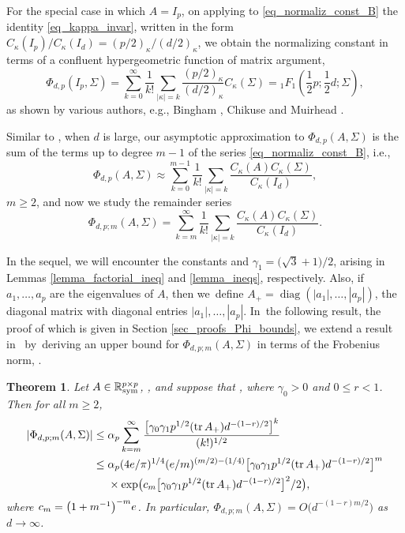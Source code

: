 \documentclass[11pt]{article}
\numberwithin{equation}{section}
\numberwithin{equation}{section}
\newtheorem{Theorem}{Theorem}[section]
\def\R {\mathbb{R}}
\def\tr {\mathop{\mathrm{tr}}}
\def\diag{\mathop{\mathrm{diag}}}
\newcommand{\sym}{{{\hskip-1pt}\mathop{\mathrm{sym}}}}
\begin{document}
For the special case in which $A = I_p$, on applying to \eqref{eq_normaliz_const_B} the identity \eqref{eq_kappa_invar}, written in the form $C_\kappa(I_p)/C_\kappa(I_d) = (p/2)_\kappa/(d/2)_\kappa$, we obtain the normalizing constant in terms of a confluent hypergeometric function of matrix argument,
\[
\Phi_{d,p}(I_p,\Sigma) = \sum_{k=0}^\infty \frac{1}{k!} \sum_{|\kappa|=k} \frac{(p/2)_\kappa}{(d/2)_\kappa} C_\kappa(\Sigma) = {}_1F_1\left(\frac12 p;\frac12 d;\Sigma\right),
\]
as shown by various authors, e.g., Bingham \cite{Bingham}, Chikuse \cite[p.~33]{Chikuse} and Muirhead \cite[p.~288]{Muirhead}.

Similar to \cite[equation~(2.4)]{BagyanRichards}, when $d$ is large, our asymptotic approximation to $\Phi_{d,p}(A,\Sigma)$ is the sum of the terms up to degree $m-1$ of the series \eqref{eq_normaliz_const_B}, i.e.,
\begin{equation}
\label{eq_trunc_expan}
\Phi_{d,p}(A,\Sigma) \approx \sum_{k=0}^{m-1} \frac{1}{k!} \sum_{|\kappa|=k} \frac{C_\kappa(A) C_\kappa(\Sigma)}{C_\kappa(I_d)},
\end{equation}
$m \ge 2$, and now we study the remainder series
\begin{equation}
\label{eq_remainder_term}
\Phi_{d,p;m}(A,\Sigma) = \sum_{k=m}^\infty \frac{1}{k!} \sum_{|\kappa|=k} \frac{C_\kappa(A) C_\kappa(\Sigma)}{C_\kappa(I_d)}.
\end{equation}

In the sequel, we will encounter the constants  and $\gamma_1 = \bigl(\sqrt{3}+1\bigr)/2$, arising in Lemmas \ref{lemma_factorial_ineq} and \ref{lemma_ineqs}, respectively. Also, if $a_1,\ldots,a_p$ are the eigenvalues of $A$, then we~define $A_+ = \diag(|a_1|,\ldots,|a_p|)$, the diagonal matrix with diagonal entries $|a_1|,\ldots,|a_p|$. In~the following result, the proof of which is given in Section \ref{sec_proofs_Phi_bounds}, we extend a result in~\cite{BagyanRichards} by~deriving an upper bound for $\Phi_{d,p;m}(A,\Sigma)$ in terms of the Frobenius norm, \smash{$\|\Sigma\| = \bigl[\tr\bigl(\Sigma^2\bigr)\bigr]^{1/2}$}.

\begin{Theorem}
\label{thm_Phi_m_bound_Bingham}
Let $A \in \R^{p \times p}_\sym$, \smash{$\Sigma \in \R^{d \times d}_\sym$}, and suppose that , where $\gamma_0 > 0$ and $0 \le r < 1$. Then for all $m \ge 2$,
\begin{align}
|\Phi_{d,p;m}(A,\Sigma)| \le{}& \alpha_p \sum_{k=m}^\infty \frac{\bigl[\gamma_0 \gamma_1 p^{1/2} (\tr A_+) d^{-(1-r)/2}\bigr]^k}{(k!)^{1/2}} \label{eq_Phi_m_bound} \\
\le{}& \alpha_p (4 {\rm e}/\pi)^{1/4} ({\rm e}/m)^{(m/2)-(1/4)}
\bigl[\gamma_0 \gamma_1 p^{1/2} (\tr A_+) d^{-(1-r)/2}\bigr]^m \nonumber \\
& \times \exp\bigl(c_m \bigl[\gamma_0 \gamma_1 p^{1/2} (\tr A_+) d^{-(1-r)/2}\bigr]^2/2\bigr), \label{eq_Phi_m_boundw}
\end{align}
where $c_m = \bigl(1+m^{-1}\bigr)^{-m} {\rm e}$. In particular, $\Phi_{d,p;m}(A,\Sigma) = O\bigl(d^{-(1-r)m/2}\bigr)$ as $d \to \infty$.
\end{Theorem}
\end{document}
